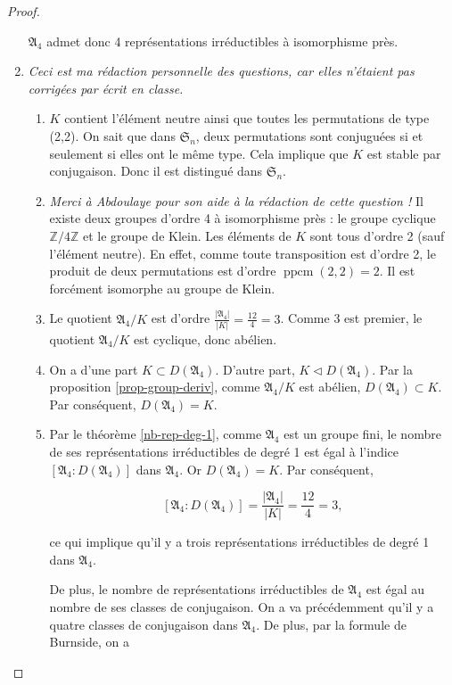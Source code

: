 \documentclass[french]{book}
\theoremstyle{definition}
\begin{document}
\begin{proof}
\begin{enumerate}
    \(\mathfrak{A}_4\) admet donc 4 représentations irréductibles à isomorphisme près.

    \item \emph{Ceci est ma rédaction personnelle des questions, car elles n'étaient pas corrigées par écrit en classe.}

    \begin{enumerate}
      \item \(K\) contient l'élément neutre ainsi que toutes les permutations de type (2,2). On sait que dans \(\mathfrak{S}_n\), deux permutations sont conjuguées si et seulement si elles ont le même type. Cela implique que \(K\) est stable par conjugaison. Donc il est distingué dans \(\mathfrak{S}_n\).
      \item \emph{Merci à Abdoulaye pour son aide à la rédaction de cette question !} Il existe deux groupes d'ordre 4 à isomorphisme près : le groupe cyclique \(\mathbb{Z}/{4}\mathbb{Z}\) et le groupe de Klein. Les éléments de \(K\) sont tous d'ordre 2 (sauf l'élément neutre). En effet, comme toute transposition est d'ordre 2, le produit de deux permutations est d'ordre \(\operatorname{ppcm}(2,2) = 2\). Il est forcément isomorphe au groupe de Klein.
      \item Le quotient \(\mathfrak{A}_4 / K\) est d'ordre \(\frac{\left\lvert \mathfrak{A}_4 \right\rvert}{\left\lvert K \right\rvert} = \frac{12}{4}=3\). Comme 3 est premier, le quotient \(\mathfrak{A}_4 / K\) est cyclique, donc abélien.
      \item On a d'une part \(K \subset D(\mathfrak{A}_4)\). D'autre part, \(K \triangleleft D(\mathfrak{A}_4)\). Par la proposition \ref{prop-group-deriv}, comme \(\mathfrak{A}_4 / K\) est abélien, \(D(\mathfrak{A}_4) \subset K\). Par conséquent, \(D(\mathfrak{A}_4) = K\).
      \item Par le théorème \ref{nb-rep-deg-1}, comme \(\mathfrak{A}_4\) est un groupe fini, le nombre de ses représentations irréductibles de degré 1 est égal à l'indice \([\mathfrak{A}_4 : D(\mathfrak{A}_4)]\) dans \(\mathfrak{A}_4\). Or \(D(\mathfrak{A}_4) = K\). Par conséquent,

      \[[\mathfrak{A}_4 : D(\mathfrak{A}_4)] = \frac{\left\lvert \mathfrak{A}_4 \right\rvert}{\left\lvert K \right\rvert} = \frac{12}{4} = 3,\]

      ce qui implique qu'il y a trois représentations irréductibles de degré 1 dans \(\mathfrak{A}_4\).

      De plus, le nombre de représentations irréductibles de \(\mathfrak{A}_4\) est égal au nombre de ses classes de conjugaison. On a va précédemment qu'il y a quatre classes de conjugaison dans \(\mathfrak{A}_4\). De plus, par la formule de Burnside, on a


\end{enumerate}
\end{enumerate}
\end{proof}
\end{document}
